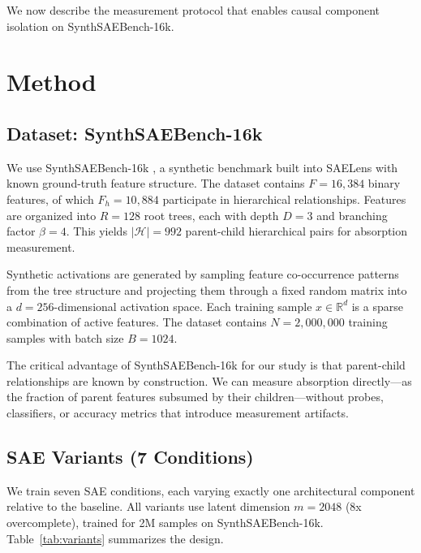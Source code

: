 \documentclass{article}
\begin{document}
We now describe the measurement protocol that enables causal component isolation on SynthSAEBench-16k.

\section{Method}

\subsection{Dataset: SynthSAEBench-16k}

We use SynthSAEBench-16k \citep{chanin2026synthsaebench}, a synthetic benchmark built into SAELens with known ground-truth feature structure. The dataset contains $F = 16{,}384$ binary features, of which $F_h = 10{,}884$ participate in hierarchical relationships. Features are organized into $R = 128$ root trees, each with depth $D = 3$ and branching factor $\beta = 4$. This yields $|\mathcal{H}| = 992$ parent-child hierarchical pairs for absorption measurement.

Synthetic activations are generated by sampling feature co-occurrence patterns from the tree structure and projecting them through a fixed random matrix into a $d = 256$-dimensional activation space. Each training sample $x \in \mathbb{R}^d$ is a sparse combination of active features. The dataset contains $N = 2{,}000{,}000$ training samples with batch size $B = 1024$.

The critical advantage of SynthSAEBench-16k for our study is that parent-child relationships are known by construction. We can measure absorption directly---as the fraction of parent features subsumed by their children---without probes, classifiers, or accuracy metrics that introduce measurement artifacts.

\subsection{SAE Variants (7 Conditions)}

We train seven SAE conditions, each varying exactly one architectural component relative to the baseline. All variants use latent dimension $m = 2048$ (8x overcomplete), trained for 2M samples on SynthSAEBench-16k. Table~\ref{tab:variants} summarizes the design.
\end{document}

